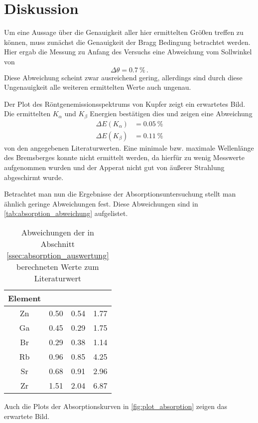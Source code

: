 \section{Diskussion}
\label{sec:Diskussion}

Um eine Aussage über die Genauigkeit aller hier ermittelten Grö0en treffen zu können,
muss zunächst die Genauigkeit der Bragg Bedingung betrachtet werden.
Hier ergab die Messung zu Anfang des Versuchs eine Abweichung vom Sollwinkel von
\begin{equation*}
    \Delta\theta = \SI{0.7}{\percent} \, .
\end{equation*}
Diese Abweichung scheint zwar ausreichend gering, allerdings sind durch diese Ungenauigkeit alle weiteren ermittelten Werte auch ungenau.

Der Plot des Röntgenemissionsspektrums von Kupfer zeigt ein erwartetes Bild.
Die ermittelten $K_\alpha$ und $K_\beta$ Energien bestätigen dies und zeigen eine Abweichung 
\begin{align*}
    \Delta E(K_\alpha) &= \SI{0.05}{\percent} \\
    \Delta E(K_\beta) &= \SI{0.11}{\percent}
\end{align*}
von den angegebenen Literaturwerten.
Eine minimale bzw. maximale Wellenlänge des Bremsberges konnte nicht ermittelt werden, da hierfür zu wenig Messwerte aufgenommen wurden und der Apperat nicht gut von äußerer Strahlung abgeschirmt wurde.


Betrachtet man nun die Ergebnisse der Absorptionsuntersuchung stellt man ähnlich geringe Abweichungen fest.
Diese Abweichungen sind in \autoref{tab:absorption_abweichung} aufgelistet.
\begin{table}
    \centering
    \caption{Abweichungen der in Abschnitt \ref{ssec:absorption_auswertung} berechneten Werte zum Literaturwert}
    \begin{tabular}{c S S S}
        \toprule
        Element &  & \tableSI{\Delta\theta}{\percent} & \tableSI{\Delta\sigma}{\percent} \\
        \midrule
        Zn & 0.50 & 0.54 & 1.77 \\
        Ga & 0.45 & 0.29 & 1.75 \\
        Br & 0.29 & 0.38 & 1.14 \\
        Rb & 0.96 & 0.85 & 4.25 \\
        Sr & 0.68 & 0.91 & 2.96 \\
        Zr & 1.51 & 2.04 & 6.87 \\
        \bottomrule
    \end{tabular}
    \label{tab:absorption_auswertung}
\end{table}
Auch die Plots der Absorptionskurven in \autoref{fig:plot_absorption} zeigen das erwartete Bild.

